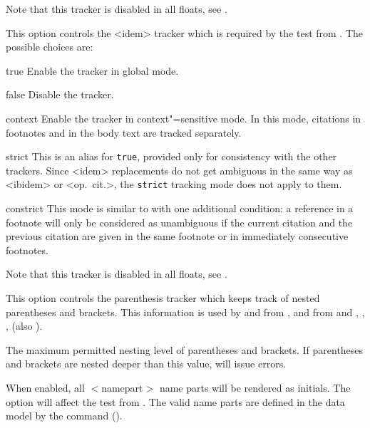 \documentclass{ltxdockit}[2011/03/25]
\newcommand*{\biblatex}{\sty{biblatex}\xspace}
\begin{document}
\begin{optionlist}
Note that this tracker is disabled in all floats, see .


This option controls the <idem> tracker which is required by the  test from . The possible choices are:

\begin{valuelist}
\item[true] Enable the tracker in global mode.
\item[false] Disable the tracker.
\item[context] Enable the tracker in context"=sensitive mode. In this mode, citations in footnotes and in the body text are tracked separately.
\item[strict] This is an alias for \texttt{true}, provided only for consistency with the other trackers. Since <idem> replacements do not get ambiguous in the same way as <ibidem> or <op.~cit.>, the \texttt{strict} tracking mode does not apply to them.
\item[constrict] This mode is similar to  with one additional condition: a reference in a footnote will only be considered as unambiguous if the current citation and the previous citation are given in the same footnote or in immediately consecutive footnotes.
\end{valuelist}

Note that this tracker is disabled in all floats, see .


This option controls the parenthesis tracker which keeps track of nested parentheses and brackets. This information is used by  and  from ,  and  from  and , , ,  (also ).


The maximum permitted nesting level of parentheses and brackets. If parentheses and brackets are nested deeper than this value, \biblatex will issue errors.


When enabled, all $<$namepart$>$ name parts will be rendered as initials. The option will affect the  test from . The valid name parts are defined in the data model by the  command ().


\end{optionlist}
\end{document}
